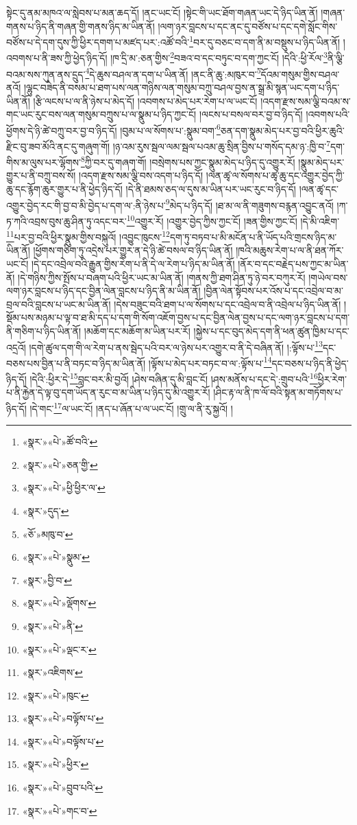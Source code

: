 སྟེང་དུ་ནམ་མཁའ་ལ་སླེབས་པ་མན་ཆད་དོ། །ནང་ཡང་ངོ། །སྟེང་གི་ཡང་ཐོག་གཞན་ཡང་དེ་ཉིད་ཡིན་ནོ། །གཞན་གནས་པ་ཉིད་ནི་གཞན་གྱི་གནས་ཉིད་མ་ཡིན་ནོ། །ལག་ཉར་བླངས་པ་དང་ནང་དུ་བཙོས་པ་དང་དགེ་སློང་གིས་བཙོས་པ་དེ་དག་དུས་ཀྱི་ཕྱིར་དགག་པ་མཛད་པར་:འཚོ་བའི་\footnote{«སྣར་»«པེ་»ཚོ་བའི་}བར་དུ་བཅང་བ་དག་ནི་མ་བསྡུས་པ་ཉིད་ཡིན་ནོ། །འབགས་པ་ནི་ཟས་ཀྱི་ཕྱེད་ཉིད་དོ། །ཁ་དྲི་མ་:ཅན་གྱིས་\footnote{«སྣར་»«པེ་»ཅན་གྱི་}བཟའ་བ་དང་བཏུང་བ་དག་ཀྱང་ངོ། །དེའི་:ཕྱི་རོལ་\footnote{«སྣར་»«པེ་»ཕྱི་ཕྱིར་ལ་}ནི་ལྕི་བའམ་སས་ཀུན་ནས་དྲུད་\footnote{«སྣར་»དུད་}དེ་ཆུས་བཤལ་ན་དག་པ་ཡིན་ནོ། །ནང་ནི་ཆུ་:མཁུར་བ་\footnote{«ཅོ་»མཁུ་བ་}དོའམ་གསུམ་གྱིས་བཤལ་ནའོ། །ལྷུང་བཟེད་ནི་བསམ་པ་ཐག་པས་ལན་གཉིས་ལན་གསུམ་བཀྲུ་བཤལ་བྱས་ན་སྒྲ་མི་སྙན་ཡང་དག་པ་ཉིད་ཡིན་ནོ། །རྩི་ལངས་པ་ལ་ནི་ཉེས་པ་མེད་དོ། །འབགས་པ་མེད་པར་རེག་པ་ལ་ཡང་ངོ། །འདག་རྫས་སམ་ལྕི་བའམ་ས་གང་ཡང་རུང་བས་ལན་གསུམ་བཀྲུས་པ་ལ་སྣུམ་པ་ཉིད་ཀྱང་ངོ། །ལངས་པ་བསལ་བར་བྱ་བ་ཉིད་དོ། །འབགས་པའི་ཕྱོགས་དེ་ཉི་ཚེ་བཀྲུ་བར་བྱ་བ་ཉིད་དོ། །བུམ་པ་ལ་སོགས་པ་:སྣུམ་བག་\footnote{«སྣར་»«པེ་»སྣུམ་}ཅན་དག་སྣུམ་མེད་པར་བྱ་བའི་ཕྱིར་ཆུའི་རྫིང་བུ་ཟབ་མོའི་ནང་དུ་གཞུག་གོ། །ཉ་འམ་རུས་སྦལ་ལམ་སྦལ་པའམ་ཆུ་སྲིན་བྱིས་པ་གསོད་དམ་ཉ་:ཁྱི་བ་\footnote{«སྣར་»བྱི་བ་}དག་གིས་མ་ལུས་པར་ལྷོགས་\footnote{«སྣར་»«པེ་»ལྡོགས་}ཀྱི་བར་དུ་གཞག་གོ། །བསྲེགས་པས་ཀྱང་སྣུམ་མེད་པ་ཉིད་དུ་འགྱུར་རོ། །སྣུམ་མེད་པར་གྱུར་པ་ནི་བཀྲུ་བས་སོ། །འདག་རྫས་སམ་ལྕི་བས་འདག་པ་ཉིད་དོ། །ལན་ཚྭ་ལ་སོགས་པ་ཚྭ་ཆུ་དང་འགྱུར་བྱེད་ཀྱི་ཆུ་དང་རྙོག་ཆུར་གྱུར་པ་ནི་ཕྱེད་ཉིད་དོ། །དེ་ནི་ཐམས་ཅད་ལ་དུས་མ་ཡིན་པར་ཡང་རུང་བ་ཉིད་དོ། །ལན་ཚྭ་དང་འགྱུར་བྱེད་རང་གི་བྱ་བ་མི་བྱེད་པ་དག་ལ་:ནི་ཉེས་པ་\footnote{«སྣར་»«པེ་»ནི་}མེད་པ་ཉིད་དོ། །ཐ་མ་ལ་ནི་གཟུགས་བརྙན་འབྱུང་ནའོ། །ཀ་ཏ་ཀའི་འབྲས་བུས་ཆུ་ཤིན་ཏུ་འདང་བར་\footnote{«སྣར་»«པེ་»ལྡང་ར་}འགྱུར་རོ། །འགྱུར་བྱེད་ཀྱིས་ཀྱང་ངོ། །ཟན་གྱིས་ཀྱང་ངོ། །དེ་མི་འཇིག་\footnote{«སྣར་»འཇིགས་}པར་བྱ་བའི་ཕྱིར་སྣུམ་གྱིས་བསྐུའོ། །འབྱུང་ཁུངས་\footnote{«སྣར་»«པེ་»ཁུང་}དག་ཏུ་བཏབ་པ་མི་མངོན་པ་ནི་ཡོད་པའི་གྲངས་ཉིད་མ་ཡིན་ནོ། །ཕྱོགས་གཅིག་ཏུ་འདྲེས་པར་གྱུར་ན་དེ་ཉི་ཚེ་བསལ་བ་ཉིད་ཡིན་ནོ། །ཁའི་མཆུས་རེག་པ་ལ་ནི་ཐན་ཀོར་ཡང་ངོ། །དེ་དང་འབྲེལ་བའི་རྒྱུན་གྱིས་རེག་པ་ནི་དེ་ལ་རེག་པ་ཉིད་མ་ཡིན་ནོ། །ནོར་བ་དང་བརྗེད་པས་ཀྱང་མ་ཡིན་ནོ། །དེ་གཉིས་ཀྱིས་སྤོས་པ་བཞག་པའི་ཕྱིར་ཡང་མ་ཡིན་ནོ། །གནས་ཀྱི་ཐག་ཤིན་ཏུ་ཉེ་བར་བཀུར་རོ། །གཡེལ་བས་ལག་ཉར་བླངས་པ་ཉིད་དང་བྱིན་ལེན་བླངས་པ་ཉིད་ནི་མ་ཡིན་ནོ། །བྱིན་ལེན་སྟོབས་པར་འོས་པ་དང་འབྲེལ་བ་མ་བྲལ་བའི་བླངས་པ་ཡང་མ་ཡིན་ནོ། །དེས་བཟུང་བའི་ཐག་པ་ལ་སོགས་པ་དང་འབྲེལ་བ་ནི་འབྲེལ་པ་ཉིད་ཡིན་ནོ། །སྡོམ་པས་མཉམ་པ་ལྟ་བ་ཐ་མི་དད་པ་དག་གི་སོག་འཇོག་བྱས་པ་དང་བྱིན་ལེན་བྱས་པ་དང་ལག་ཉར་བླངས་པ་དག་ནི་གཅིག་པ་ཉིད་ཡིན་ནོ། །མཆོག་དང་མཆོག་མ་ཡིན་པར་རོ། །སྐྱེས་པ་དང་བུད་མེད་དག་ནི་ཕན་ཚུན་ཁྱིམ་པ་དང་འདྲའོ། །དགེ་ཚུལ་དག་གི་ལ་རེག་པ་ནས་སྦེད་པའི་བར་ལ་ཉེས་པར་འགྱུར་བ་ནི་དེ་བཞིན་ནོ། །:ལྟོས་པ་\footnote{«སྣར་»«པེ་»བལྟོས་པ་}དང་བཅས་པས་བྱིན་པ་ནི་བཏང་བ་ཉིད་མ་ཡིན་ནོ། །ལྟོས་པ་མེད་པར་བཏང་བ་ལ་:ལྟོས་པ་\footnote{«སྣར་»«པེ་»བལྟོས་པ་}དང་བཅས་པ་ཉིད་ནི་ཕྱེད་ཉིད་དོ། །དེའི་:ཕྱིར་དེ་\footnote{«སྣར་»«པེ་»ཕྱིར་}བླང་བར་མི་བྱའོ། །ཤེས་བཞིན་དུ་མི་བླང་ངོ། །ཤས་མནོས་པ་དང་དེ་:གྲུབ་པའི་\footnote{«སྣར་»«པེ་»བྲུབ་པའི་}ཕྱིར་རེག་པ་ནི་རྐྱེན་དེ་ལྟ་བུ་དག་ཡོད་ན་རུང་བ་མ་ཡིན་པ་ཉིད་དུ་མི་འགྱུར་རོ། །ཤིང་རྟ་ལ་ནི་ཁ་ལོ་བའི་སྟན་མ་གཏོགས་པ་ཉིད་དོ། །དེ་གང་\footnote{«སྣར་»«པེ་»གང་བ་}ལ་ཡང་ངོ། །ནད་པ་ཞོན་པ་ལ་ཡང་ངོ། །གྲུ་ལ་ནི་རུ་སྐྱའོ། །
